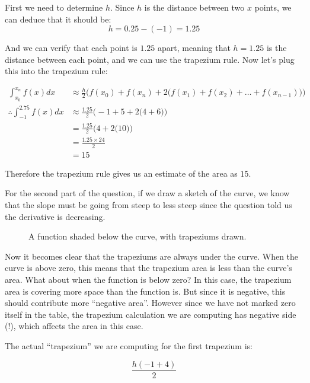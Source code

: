 \begin{solution}
    First we need to determine $h$. Since $h$ is the distance between two $x$ points, we can deduce that it should be:
    \[ h= 0.25 - (-1) = 1.25\]

    And we can verify that each point is $1.25$ apart, meaning that $h=1.25$ is the distance between each point, and we can use the trapezium rule.
    Now let's plug this into the trapezium rule:

    \begin{align*}
    \int_{x_0}^{x_n}f(x) dx  &\approx  \frac{h}{2} \bigg(  f(x_0) + f(x_n) + 2\big( f(x_{1})+ f(x_{2}) + \dots + f(x_{n-1})\big) \bigg) \\
    \therefore \int_{-1}^{2.75}f(x) dx  &\approx  \frac{1.25}{2} \bigg(  -1 + 5 + 2\big( 4 + 6 \big) \bigg) \\
    &= \frac{1.25}{2} \bigg(  4+ 2\big( 10 \big) \bigg) \\
    &= \frac{1.25 \times 24}{2}\\
    &= 15
    \end{align*} 

    Therefore the trapezium rule gives us an estimate of the area as $15$.

    For the second part of the question, if we draw a sketch of the curve, we know that the slope must be going from steep to less steep since the question told us the derivative is decreasing.

    \begin{figure}[H]
    \centering
    \caption{A function shaded below the curve, with trapeziums drawn.}
    \label{fig:shaded-function-2}
    \end{figure}

    Now it becomes clear that the trapeziums are always under the curve. When the curve is above zero, this means that the trapezium area is less than the curve's area. What about when the function 
    is below zero? In this case, the trapezium area is covering more space than the function is. But since it is negative, this should contribute more ``negative area''. However since we have not marked zero itself in the table, the trapezium calculation we are computing has negative side (!), which affects the area in this case. 
    
    The actual ``trapezium'' we are computing for the first trapezium is:

    \[ \frac{h(-1 + 4)}{2}\]


\end{solution}
